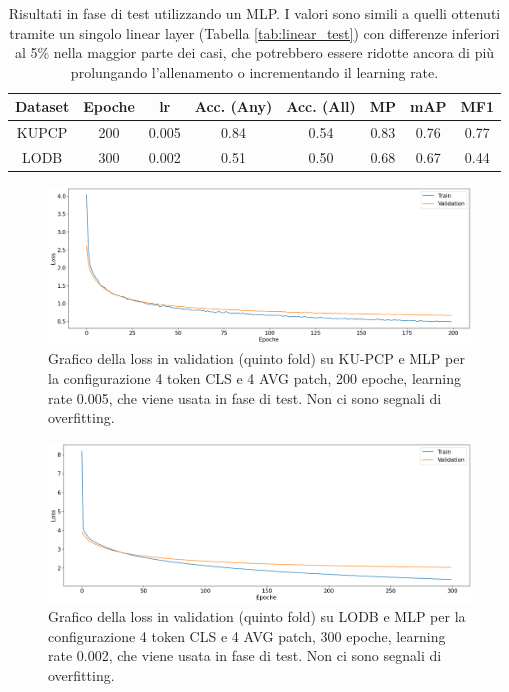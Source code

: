 \newpage
\begin{table}[p]
    \centering
    \setlength{\tabcolsep}{5pt} %
    \renewcommand{\arraystretch}{1.6} %
    \begin{tabular}{c|cc|ccccc}
         \hline
         Dataset & Epoche & lr & \textbf{Acc. (Any)} & \textbf{Acc. (All)} & \textbf{MP} & \textbf{mAP} & \textbf{MF1} \\
          \hline
          KUPCP & 200 & 0.005 & 0.84 & 0.54 & 0.83 & 0.76 & 0.77 \\
          LODB & 300 & 0.002 & 0.51 & 0.50 & 0.68 & 0.67 & 0.44 \\
          \hline
    \end{tabular}
    \caption{Risultati in fase di test utilizzando un MLP. I valori sono simili a quelli ottenuti tramite un singolo linear layer (Tabella \ref{tab:linear_test}) con differenze inferiori al 5\% nella maggior parte dei casi, che potrebbero essere ridotte ancora di più prolungando l'allenamento o incrementando il learning rate.}
    \label{tab:mlp_test}
\end{table}

\begin{figure}[p]
    \centering
    \includegraphics[width=\linewidth]{Immagini/risultati/loss_mlp_kupcp.png}
    \caption{Grafico della loss in validation (quinto fold) su KU-PCP e MLP per la configurazione 4 token CLS e 4 AVG patch, 200 epoche, learning rate 0.005, che viene usata in fase di test. Non ci sono segnali di overfitting.}
    \label{fig:loss-lodb-mlp}
\end{figure}

\begin{figure}[p]
    \centering
    \includegraphics[width=\linewidth]{Immagini/risultati/loss_mlp_lodb.png}
    \caption{Grafico della loss in validation (quinto fold) su LODB e MLP per la configurazione 4 token CLS e 4 AVG patch, 300 epoche, learning rate 0.002, che viene usata in fase di test. Non ci sono segnali di overfitting.}
    \label{fig:loss-lodb-mlp}
\end{figure}



